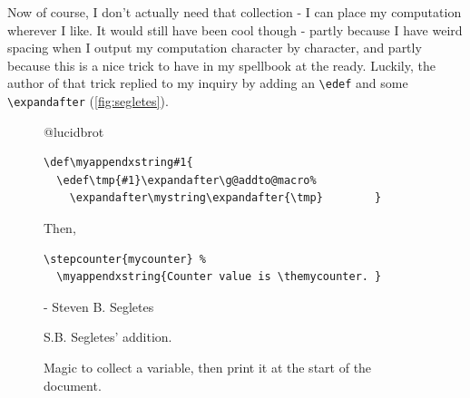 \documentclass{article} \usepackage[utf8]{inputenc}
\makeatletter
\newcommand{\code}[1]{\colorbox{codebggray}{{\texttt{#1}}}}
\def\mystring{} %
\def\thefinalstring{} %
\def\myappendstring#1{\g@addto@macro\mystring{ #1}}
\def\myappendxstring#1{\edef\tmp{#1}\expandafter\g@addto@macro\expandafter\mystring\expandafter{\tmp}}
\makeatother
\begin{document}
\label{sec:magicexplain}Now of course, I don't actually need that collection - I can place my computation wherever I like. It would still have been cool though - partly because I have weird spacing when I output my computation character by character, and partly because this is a nice trick to have in my spellbook at the ready. Luckily, the author of that trick replied to my inquiry by adding an \code{\textbackslash edef} and some \cprotect\code{\verb|\expandafter|} (\autoref{fig:segletes}).

\begin{figure}[hp]
\begin{myquote}
@lucidbrot
\begin{lstlisting}[columns=fullflexible, backgroundcolor = \color{codebggray}]
\def\myappendxstring#1{
  \edef\tmp{#1}\expandafter\g@addto@macro%
    \expandafter\mystring\expandafter{\tmp}        }
\end{lstlisting}
Then, \begin{lstlisting}[columns=fullflexible, backgroundcolor = \color{codebggray}]
\stepcounter{mycounter} %
  \myappendxstring{Counter value is \themycounter. }
\end{lstlisting}
 - Steven B. Segletes 
\end{myquote}
\caption{S.B. Segletes' addition.}
\label{fig:segletes}
\end{figure}


\begin{figure}[htbp]
\begin{samepage}
\begin{mycode}
\myappendstring{hello}
\makeatletter
{}%
\makeatother
\thefinalstring
\addtocontents{xyz}{\gdef\protect\thefinalstring{\mystring}}
\end{mycode}
\caption{Magic to collect a variable, then print it at the start of the document. }
\label{fig:magic}
\end{samepage}
\end{figure}
\end{document}

